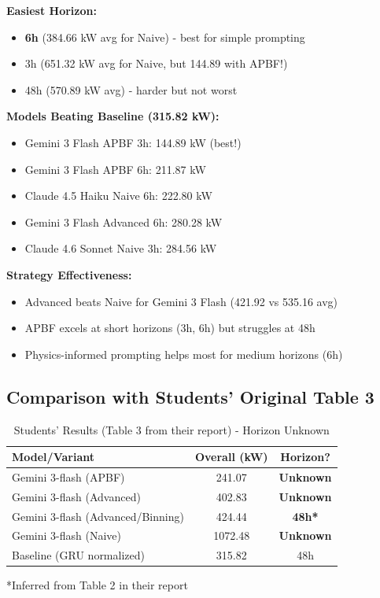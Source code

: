 \documentclass{article}
\begin{document}
\textbf{Easiest Horizon:}
\begin{itemize}
\item \textbf{6h} (384.66 kW avg for Naive) - best for simple prompting
\item 3h (651.32 kW avg for Naive, but 144.89 with APBF!)
\item 48h (570.89 kW avg) - harder but not worst
\end{itemize}

\textbf{Models Beating Baseline (315.82 kW):}
\begin{itemize}
\item Gemini 3 Flash APBF 3h: 144.89 kW (best!)
\item Gemini 3 Flash APBF 6h: 211.87 kW
\item Claude 4.5 Haiku Naive 6h: 222.80 kW
\item Gemini 3 Flash Advanced 6h: 280.28 kW
\item Claude 4.6 Sonnet Naive 3h: 284.56 kW
\end{itemize}

\textbf{Strategy Effectiveness:}
\begin{itemize}
\item Advanced beats Naive for Gemini 3 Flash (421.92 vs 535.16 avg)
\item APBF excels at short horizons (3h, 6h) but struggles at 48h
\item Physics-informed prompting helps most for medium horizons (6h)
\end{itemize}

\clearpage

\subsection*{Comparison with Students' Original Table 3}

\begin{table}[h!]
\centering
\caption{Students' Results (Table 3 from their report) - Horizon Unknown}
\begin{tabular}{lcc}
\toprule
\textbf{Model/Variant} & \textbf{Overall (kW)} & \textbf{Horizon?} \\
\midrule
Gemini 3-flash (APBF) & 241.07 & \textbf{Unknown} \\
Gemini 3-flash (Advanced) & 402.83 & \textbf{Unknown} \\
Gemini 3-flash (Advanced/Binning) & 424.44 & \textbf{48h*} \\
Gemini 3-flash (Naive) & 1072.48 & \textbf{Unknown} \\
Baseline (GRU normalized) & 315.82 & 48h \\
\bottomrule
\end{tabular}
\footnotesize{*Inferred from Table 2 in their report}
\end{table}
\end{document}
